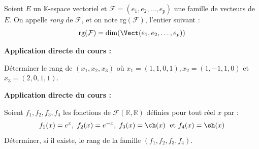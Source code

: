 \documentclass[french,11pt,twoside]{VcCours}
\newenvironment{ApplicationDirecte}{\textbf{Application directe du cours :}

}{}
\begin{document}
\begin{Definition}{} Soient $E$ un $\mathbb{K}$-espace vectoriel et $\mathcal{F} = (e_1, e_2, \ldots, e_p)$ une famille de vecteurs de $E$. On appelle \emph{rang} de $\mathcal{F}$, et on note $\textrm{rg}(\mathcal{F})$, l'entier suivant :
$$ \textrm{rg}(\mathcal{F}) = {\textrm{dim}(\Vect(e_1, e_2, \ldots, e_p))}$$
\end{Definition}

\begin{ApplicationDirecte} Déterminer le rang de $(x_{1} ,x_{2} ,x_{3})$ où $x_{1} = (1,1,0,1),x_{2} = (1, - 1,1,0)$ et $x_{3} = (2,0,1,1)$. \end{ApplicationDirecte}

\begin{ApplicationDirecte} Soient $f_1,f_2,f_3,f_4$ les fonctions de $\mathcal{F}(\mathbb{R}, \mathbb{R})$ définies pour tout réel $x$ par :
$$  f_1(x)=e^x, \; f_2(x)=e^{-x}, \; f_3(x) = \ch(x) \; \hbox{ et } f_4(x)=\sh(x)$$
Déterminer, si il existe, le rang de la famille $(f_1,f_2,f_3,f_4)$.
\end{ApplicationDirecte}


%
%
%
%
%
%
%
%
%
%
%


 
 
 
 
 
 
\end{document}
